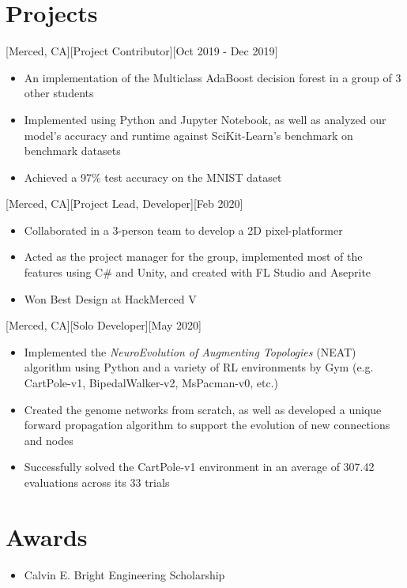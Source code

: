 \documentclass{article}
\begin{document}
\section{Projects}
[Merced, CA][Project Contributor][Oct 2019 - Dec 2019]
\begin{itemize}
  \item An implementation of the Multiclass AdaBoost decision forest in a group of 3 other students
  \item Implemented using Python and Jupyter Notebook, as well as analyzed our model's accuracy and runtime against SciKit-Learn's benchmark on benchmark datasets
  \item Achieved a 97\% test accuracy on the MNIST dataset
\end{itemize}
[Merced, CA][Project Lead, Developer][Feb 2020]
\begin{itemize}
  \item Collaborated in a 3-person team to develop a 2D pixel-platformer
  \item Acted as the project manager for the group, implemented most of the features using C\# and Unity, and created with FL Studio and Aseprite
  \item Won Best Design at HackMerced V
\end{itemize}
[Merced, CA][Solo Developer][May 2020]
\begin{itemize}
  \item Implemented the \textit{NeuroEvolution of Augmenting Topologies} (NEAT) algorithm using Python and a variety of RL environments by Gym (e.g. CartPole-v1, BipedalWalker-v2, MsPacman-v0, etc.)
  \item Created the genome networks from scratch, as well as developed a unique forward propagation algorithm to support the evolution of new connections and nodes
  \item Successfully solved the CartPole-v1 environment in an average of 307.42 evaluations across its 33 trials
\end{itemize}


\section{Awards}
\begin{itemize}
  \item Calvin E. Bright Engineering Scholarship
\end{itemize}
\end{document}

